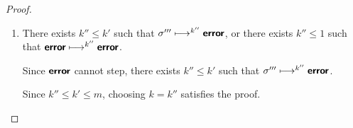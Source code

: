 \begin{proof}
\begin{enumerate}
\begin{itemize}
\begin{enumerate}
          Since $i'' \leq k' \leq m$, choosing $k = i''$ satisfies the
          proof.

        \item There exists $k'' \leq k'$ such that $\sigma'''
          \longmapsto^{k''} \textbf{\textsf{error}}$, or there exists $k'' \leq 1$ such
          that $\textbf{\textsf{error}} \longmapsto^{k''} \textbf{\textsf{error}}$.

          Since $\textbf{\textsf{error}}$ cannot step, there exists $k'' \leq k'$ such
          that $\sigma''' \longmapsto^{k''} \textbf{\textsf{error}}$.

          Since $k'' \leq k' \leq m$, choosing $k = k''$ satisfies the
          proof.
      \end{enumerate}
    \end{itemize}
  \end{enumerate}

\end{proof}
